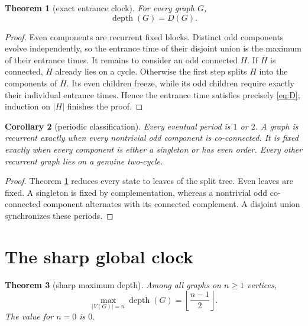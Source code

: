 \documentclass[10pt,a4paper]{amsart}
\newtheorem{theorem}{Theorem}[section]
\newtheorem{corollary}[theorem]{Corollary}
\theoremstyle{definition}
\theoremstyle{remark}
\newcommand{\depth}{\operatorname{depth}}
\begin{document}
\begin{theorem}[exact entrance clock]\label{thm:clock}
For every graph \(G\),
\[
                         \depth(G)=D(G).
\]
\end{theorem}

\begin{proof}
Even components are recurrent fixed blocks. Distinct odd components evolve
independently, so the entrance time of their disjoint union is the maximum
of their entrance times. It remains to consider an odd connected \(H\).
If \(\overline H\) is connected, \(H\) already lies on a cycle. Otherwise
the first step splits \(H\) into the components of \(\overline H\). Its even
children freeze, while its odd children require exactly their individual
entrance times. Hence the entrance time satisfies precisely \eqref{eq:D};
induction on \(|H|\) finishes the proof.
\end{proof}

\begin{corollary}[periodic classification]\label{cor:period}
Every eventual period is \(1\) or \(2\). A graph is recurrent exactly when
every nontrivial odd component is co-connected. It is fixed exactly when
every component is either a singleton or has even order. Every other
recurrent graph lies on a genuine two-cycle.
\end{corollary}

\begin{proof}
Theorem \ref{thm:clock} reduces every state to leaves of the split tree.
Even leaves are fixed. A singleton is fixed by complementation, whereas a
nontrivial odd co-connected component alternates with its connected
complement. A disjoint union synchronizes these periods.
\end{proof}

\section{The sharp global clock}

\begin{theorem}[sharp maximum depth]\label{thm:sharp}
Among all graphs on \(n\geq1\) vertices,
\begin{equation}
 \max_{|V(G)|=n}\depth(G)=\left\lfloor\frac{n-1}{2}\right\rfloor.
                                                               \label{eq:sharp}
\end{equation}
The value for \(n=0\) is \(0\).
\end{theorem}
\end{document}
